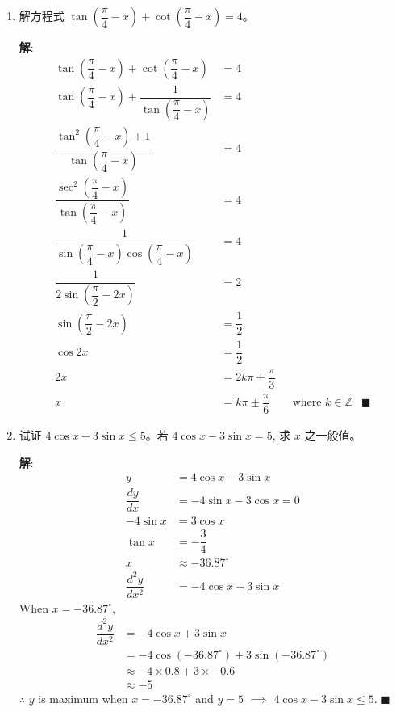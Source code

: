 \documentclass{report}
\newcommand{\sol}{\vspace{0.2cm}\textbf{解}:}
\begin{document}
\begin{enumerate}[leftmargin=*]
        \newpage
        \item 解方程式 $\tan \left(\dfrac{\pi}{4}-x\right)+\cot \left(\dfrac{\pi}{4}-x\right)=4$。
        
        \sol{}
        \begin{align*}
            \tan \left(\dfrac{\pi}{4}-x\right)+\cot \left(\dfrac{\pi}{4}-x\right) &= 4\\
           \tan \left(\dfrac{\pi}{4}-x\right)+\dfrac{1}{\tan \left(\dfrac{\pi}{4}-x\right)} &= 4\\
              \dfrac{\tan^2 \left(\dfrac{\pi}{4}-x\right) + 1}{\tan \left(\dfrac{\pi}{4}-x\right)} &= 4\\
                \dfrac{\sec^2 \left(\dfrac{\pi}{4}-x\right)}{\tan \left(\dfrac{\pi}{4}-x\right)} &= 4\\
                \dfrac{1}{\sin \left(\dfrac{\pi}{4}-x\right)\cos \left(\dfrac{\pi}{4}-x\right)} &= 4\\
                \dfrac{1}{2\sin \left(\dfrac{\pi}{2}-2x\right)} &= 2\\
                \sin \left(\dfrac{\pi}{2}-2x\right) &= \dfrac{1}{2}\\
                \cos 2x &= \dfrac{1}{2}\\
                2x &= 2k\pi \pm \dfrac{\pi}{3}\\
                x &= k\pi \pm \dfrac{\pi}{6} \qquad \text{where } k \in \mathbb{Z} & \blacksquare
        \end{align*}
       
        \item 试证 $4 \cos x-3 \sin x \leq 5$。若 $4 \cos x-3 \sin x=5$, 求 $x$ 之一般值。
        
        \sol{}
        \begin{align*}
            y &= 4 \cos x - 3 \sin x\\
            \dfrac{dy}{dx} &= -4 \sin x - 3 \cos x = 0\\
            -4 \sin x &= 3 \cos x\\
            \tan x &= -\dfrac{3}{4}\\
            x &\approx -36.87^{\circ}\\
            \dfrac{d^2y}{dx^2} &= -4 \cos x + 3 \sin x
        \end{align*}
        When $x = -36.87^{\circ}$,
        \begin{align*}
            \dfrac{d^2y}{dx^2} &= -4 \cos x + 3 \sin x\\
            &= -4 \cos(-36.87^{\circ}) + 3 \sin(-36.87^{\circ})\\
            &\approx -4 \times 0.8 + 3 \times -0.6\\
            &\approx -5
        \end{align*}
        $\therefore$ $y$ is maximum when $x = -36.87^{\circ}$ and $y = 5$ $\implies$ $4 \cos x - 3 \sin x \leq 5$. \hfill $\blacksquare$


\end{enumerate}
\end{document}
